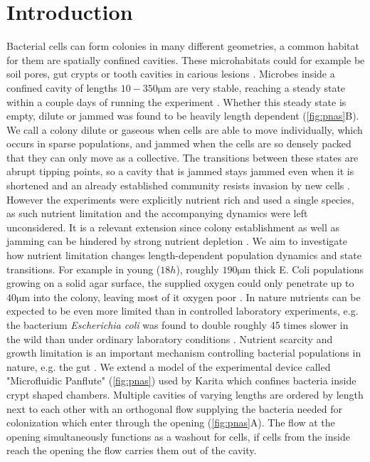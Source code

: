 \documentclass[11pt,a4paper]{report}
\begin{document}
	\chapter{Introduction}
	Bacterial cells can form colonies in many different geometries, a common habitat for them are spatially confined cavities. These microhabitats could for example be soil pores, gut crypts or tooth cavities in carious lesions \cite{Karita, tooth}. Microbes inside a confined cavity of lengths $10-350 \mathrm{\mu m}$ are very stable, reaching a steady state within a couple days of running the experiment \cite{Karita}. Whether this steady state is empty, dilute or jammed was found to be heavily length dependent (\cref{fig:pnas}B). We call a colony dilute or gaseous when cells are able to move individually, which occurs in sparse populations, and jammed when the cells are so densely packed that they can only move as a collective. The transitions between these states are abrupt tipping points, so a cavity that is jammed stays jammed even when it is shortened and an already established community resists invasion by new cells \cite{Karita}. However the experiments were explicitly nutrient rich and used a single species, as such nutrient limitation and the accompanying dynamics were left unconsidered. It is a relevant extension since colony establishment as well as jamming can be hindered by strong nutrient depletion \cite{Karita}. We aim to investigate how nutrient limitation changes length-dependent population dynamics and state transitions. For example in young ($18h$),  roughly $190\mathrm{\mu m}$ thick E. Coli populations growing on a solid agar surface, the supplied oxygen could only penetrate up to $40 \mathrm{\mu m}$ into the colony, leaving most of it oxygen poor \cite{thick}. In nature nutrients can be expected to be even more limited than in controlled laboratory experiments, e.g. the bacterium \textit{Escherichia coli} was found to double roughly 45 times slower in the wild than under ordinary laboratory conditions \cite{wild}. Nutrient scarcity and growth limitation is an important mechanism controlling bacterial populations in nature, e.g. the gut \cite{gut}. We extend a model of the experimental device called "Microfluidic Panflute" (\cref{fig:pnas}) used by Karita \cite{Karita} which confines bacteria inside crypt shaped chambers. Multiple cavities of varying lengths are ordered by length next to each other with an orthogonal flow supplying the bacteria needed for colonization which enter through the opening (\cref{fig:pnas}A). The flow at the opening  simultaneously functions as a washout for cells, if cells from the inside reach the opening the flow carries them out of the cavity.
\end{document}
